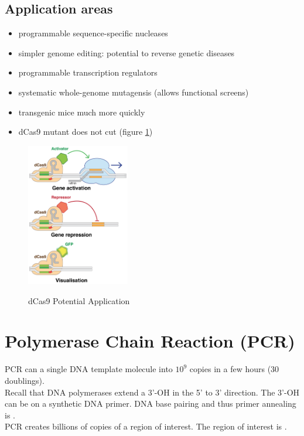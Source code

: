 \subsection{Application areas}
\begin{itemize}
    \item programmable sequence-specific nucleases
    \item simpler genome editing: potential to reverse genetic diseases
    \item programmable transcription regulators
    \item systematic whole-genome mutagensis (allows functional screens)
    \item transgenic mice much more quickly
    \item dCas9 mutant does not cut (figure \ref{dCas9})
\end{itemize}
\begin{figure}[h]
\centering
\includegraphics[width=0.4\textwidth]{images/Dead-Cas9_potential_applications.png}\\[.2in]
\caption{dCas9 Potential Application}
\label{dCas9}
\end{figure}
\section{Polymerase Chain Reaction (PCR)}
PCR can  a single DNA template molecule into $10^9$ copies in a few hours (30 doublings).\\[.2in]
Recall that DNA polymerases extend a 3'-OH in the 5' to 3' direction. The 3'-OH can be on a synthetic DNA primer. DNA base pairing and thus primer annealing is .\\[.2in]
PCR creates billions of copies of a region of interest. The region of interest is .
